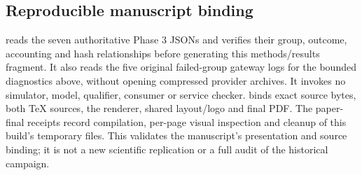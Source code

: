 \subsection{Reproducible manuscript binding}
 reads the seven authoritative Phase 3 JSONs and verifies
their group, outcome, accounting and hash relationships before generating this
methods/results fragment. It also reads the five original failed-group gateway
logs for the bounded diagnostics above, without opening compressed provider
archives. It invokes no simulator, model, qualifier, consumer or service checker.
 binds exact source bytes, both TeX sources, the renderer,
shared layout/logo and final PDF. The paper-final receipts record compilation,
per-page visual inspection and cleanup of this build's temporary files.
This validates the manuscript's presentation and source binding; it is not a
new scientific replication or a full audit of the historical campaign.
